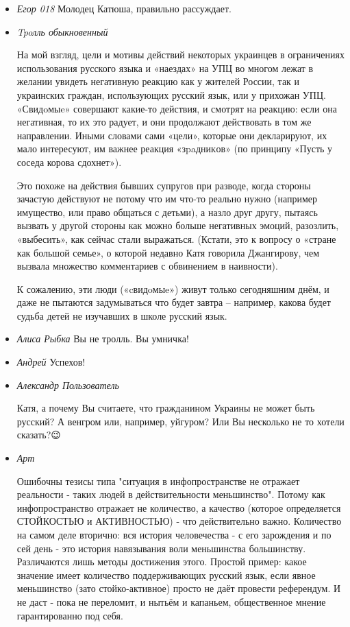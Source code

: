 \begin{itemize}
\item \emph{Егор 018}
Молодец Катюша, правильно рассуждает.

\item \emph{Tpoлль обыкновенный}

На мой взгляд, цели и мотивы действий некоторых украинцев в ограничениях
использования русского языка и «наездах» на УПЦ во многом лежат в желании
увидеть негативную реакцию как у жителей России, так и украинских граждан,
использующих русский язык, или у прихожан УПЦ. «Сʙᴎдoᴍыe» совершают какие-то
действия, и смотрят на реакцию: если она негативная, то их это радует, и они
продолжают действовать в том же направлении. Иными словами сами «цели», которые
они декларируют, их мало интересуют, им важнее реакция «зpaдʜᴎᴋᴏʙ» (по принципу
«Пусть у соседа корова сдохнет»).

Это похоже на действия бывших супругов при разводе, когда стороны зачастую
действуют не потому что им что-то реально нужно (например имущество, или право
общаться с детьми), а назло друг другу, пытаясь вызвать у другой стороны как
можно больше негативных эмоций, разозлить, «выбесить», как сейчас стали
выражаться. (Кстати, это к вопросу о «стране как большой семье», о которой
недавно Катя говорила Джангирову, чем вызвала множество комментариев с
обвинением в наивности).

К сожалению, эти люди («cʙᴎдoᴍыe») живут только сегодняшним днём, и даже не
пытаются задумываться что будет завтра -- например, какова будет судьба детей
не изучавших в школе русский язык.

\item \emph{Алиса Рыбка}
Вы не тролль. Вы умничка!

\item \emph{Андрей}
Успехов!

\item \emph{Александр Пользователь}

Катя, а почему Вы считаете, что гражданином Украины не может быть русский? А
венгром или,  например,  уйгуром? Или Вы несколько не то хотели сказать?😉

\item \emph{Арт}

Ошибочны тезисы типа "ситуация в инфопространстве не отражает реальности -
таких людей в действительности меньшинство". Потому как инфопространство
отражает не количество, а качество (которое определяется СТОЙКОСТЬЮ и
АКТИВНОСТЬЮ) - что действительно важно. Количество на самом деле вторично: вся
история человечества - с его зарождения и по сей день - это история навязывания
воли меньшинства большинству. Различаются лишь методы достижения этого.
Простой пример: какое значение имеет количество поддерживающих русский язык,
если явное меньшинство (зато стойко-активное) просто не даёт провести
референдум. И не даст - пока не переломит, и нытьём и капаньем, общественное
мнение гарантированно под себя.


\end{itemize}
